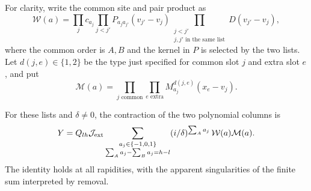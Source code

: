 For clarity, write the common site and pair product as
\[
 \mathcal W(a)=\prod_j c_{a_j}\prod_{j<j'}P_{a_ja_{j'}}(v_{j'}-v_j)
    \prod_{\substack{j<j'\\j,j'\text{ in the same list}}}D(v_{j'}-v_j),
\]
where the common order is \(A,B\) and the kernel in \(P\) is selected by the two lists. Let \(d(j,e)\in\{1,2\}\) be the type just specified for common slot \(j\) and extra slot \(e\), and put
\[
 \mathcal M(a)=\prod_{j\text{ common}}\prod_{e\text{ extra}}
       M^{d(j,e)}_{a_j}(x_e-v_j).
\]
\begin{auxproposition}
For these lists and \(\delta\ne0\), the contraction of the two polynomial columns is
\begin{equation}\label{eq:finite-marked-contraction}
 Y=Q_{lh}\mathcal J_{\rm ext}
   \sum_{\substack{a_j\in\{-1,0,1\}\\\sum_Aa_j-\sum_Ba_j=h-l}}
       (i/\delta)^{\sum_Aa_j}\,\mathcal W(a)\mathcal M(a).
\end{equation}
The identity holds at all rapidities, with the apparent singularities of the finite sum interpreted by removal.
\end{auxproposition}

